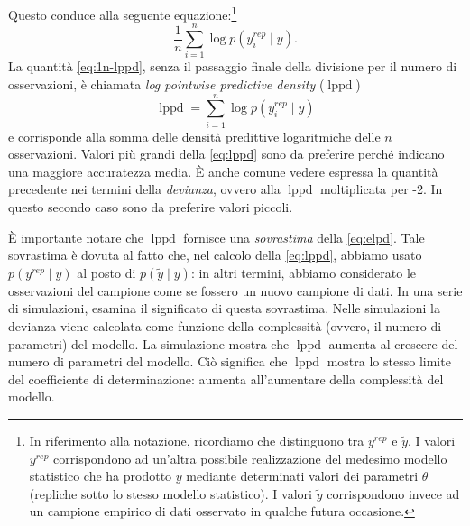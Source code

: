 \documentclass[
  10pt,
  italian,
  a4paper,
  extrafontsizes,onecolumn,openright
  ]{memoir}
\DeclareMathOperator{\lppd}{lppd} %
\theoremstyle{definition}
\theoremstyle{definition}
\theoremstyle{definition}
\theoremstyle{definition}
\theoremstyle{remark}
\begin{document}
Questo conduce alla seguente equazione:\footnote{In riferimento alla notazione, ricordiamo che \textcite{gelman2014understanding} distinguono tra \(y^{rep}\) e \(\tilde{y}\). I valori \(y^{rep}\) corrispondono ad un'altra possibile realizzazione del medesimo modello statistico che ha prodotto \(y\) mediante determinati valori dei parametri \(\theta\) (repliche sotto lo stesso modello statistico). I valori \(\tilde{y}\) corrispondono invece ad un campione empirico di dati osservato in qualche futura occasione.}
\begin{equation}
\frac{1}{n} \sum_{i=1}^n \log p(y_i^{rep} \mid y).
\label{eq:1n-lppd}
\end{equation}
La quantità \eqref{eq:1n-lppd}, senza il passaggio finale della divisione per il numero di osservazioni, è chiamata \emph{log pointwise predictive density} (\(\lppd\))
\begin{equation}
\lppd = \sum_{i=1}^n \log p(y_i^{rep} \mid y)
\label{eq:lppd}
\end{equation}
e corrisponde alla somma delle densità predittive logaritmiche delle \(n\) osservazioni. Valori più grandi della \eqref{eq:lppd} sono da preferire perché indicano una maggiore accuratezza media. È anche comune vedere espressa la quantità precedente nei termini della \emph{devianza}, ovvero alla \(\lppd\) moltiplicata per -2. In questo secondo caso sono da preferire valori piccoli.

È importante notare che \(\lppd\) fornisce una \emph{sovrastima} della \eqref{eq:elpd}. Tale sovrastima è dovuta al fatto che, nel calcolo della \eqref{eq:lppd}, abbiamo usato \(p(y^{rep} \mid y)\) al posto di \(p(\tilde{y} \mid y)\): in altri termini, abbiamo considerato le osservazioni del campione come se fossero un nuovo campione di dati. In una serie di simulazioni, \textcite{McElreath_rethinking} esamina il significato di questa sovrastima. Nelle simulazioni la devianza viene calcolata come funzione della complessità (ovvero, il numero di parametri) del modello. La simulazione mostra che \(\lppd\) aumenta al crescere del numero di parametri del modello. Ciò significa che \(\lppd\) mostra lo stesso limite del coefficiente di determinazione: aumenta all'aumentare della complessità del modello.
\end{document}
